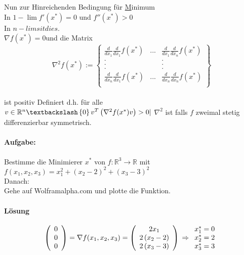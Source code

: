 \documentclass[11pt,a4paper]{article}
\begin{document}
    Nun zur Hinreichenden Bedingung für \underline Minimum\\
    In $1-\lim f'(x^*)=0$ und $f''(x^*)>0$\\
    In $n-lim sit dies$.\\
    $\nabla f(x^*)=0$und die Matrix\\
    \[
    \nabla^2f(x^*):=\left\lbrace
    \begin{array}{rrr}
      \frac{d}{dx_1}\frac{d}{dx_1}f(x^*)&...&\frac{d}{dx_1}\frac{d}{dx_n}f(x^*)\\
      .&&.\\
      .&&.\\
      .&&.\\
      \frac{d}{dx_n}\frac{d}{dx_1}f(x^*)&...&\frac{d}{dx_n}\frac{d}{dx_n}f(x^*)\\
    \end{array}
    \right\rbrace
    \]\\
    ist positiv Definiert d.h. für alle \\
    $v\in \mathbb{R}^n\textbackslash\left\lbrace 0 \right\rbrace v^T\left( \nabla^2 f(x^*) v\right)>0 | $ $\nabla^2$ ist falls $f$ zweimal stetig differenzierbar symmetrisch.\\
    \paragraph{Aufgabe:}
    Bestimme die Minimierer $x^*$ von $f:\mathbb{R}^3\to\mathbb{R}$ mit $f\left(x_1,x_2,x_3\right)=x_1^2+\left(x_2-2\right)^2+\left(x_3-3\right)^2$\\
    Danach:\\
    Gehe auf Wolframalpha.com und plotte die Funktion.\\

    \paragraph{Lösung}

    \[
      \left(\begin{array}{c} 0 \\ 0 \\ 0\end{array} \right)= \nabla f(x_1,x_2,x_3)= \left(\begin{array}{c} 2x_1 \\ 2\left(x_2-2\right) \\ 2\left( x_3 -3\right)\end{array}\right)\\
      \Rightarrow \begin{array}{c} x_1^*=0 \\ x_2^*=2 \\ x_3^*=3\end{array}
    \]
\end{document}
